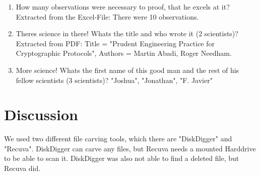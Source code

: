 \documentclass{scrreprt}
\begin{document}
\begin{enumerate}
\item How many observations were necessary to proof, that he excels at it? Extracted from the Excel-File: There were 10 observations.
\item Theres science in there! Whats the title and who wrote it (2 scientists)? Extracted from PDF: Title = "Prudent Engineering Practice for Cryptographic Protocols", Authors = Martin Abadi, Roger Needham.
\item More science! Whats the first name of this good man and the rest of his fellow scientists
(3 scientists)? "Joshua", "Jonathan", "F. Javier"
\end{enumerate}
\section{Discussion}
We used two different file carving tools, which there are "DiskDigger" and "Recuva". DiskDigger can carve any files, but Recuva needs a mounted Harddrive to be able to scan it. DiskDigger was also not able to find a deleted file, but Recuva did.
\end{document}
